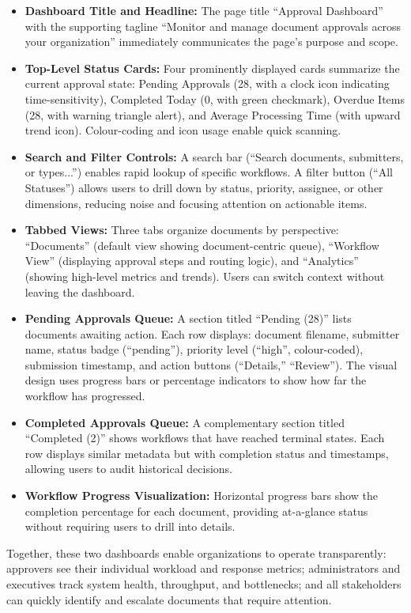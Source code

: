 \documentclass[12pt,oneside,openright,a4paper]{cpe-english-project}
\begin{document}
\begin{itemize}
\item \textbf{Dashboard Title and Headline:} The page title ``Approval Dashboard'' with the supporting tagline ``Monitor and manage document approvals across your organization'' immediately communicates the page's purpose and scope.
\item \textbf{Top-Level Status Cards:} Four prominently displayed cards summarize the current approval state: Pending Approvals (28, with a clock icon indicating time-sensitivity), Completed Today (0, with green checkmark), Overdue Items (28, with warning triangle alert), and Average Processing Time (with upward trend icon). Colour-coding and icon usage enable quick scanning.
\item \textbf{Search and Filter Controls:} A search bar (``Search documents, submitters, or types...'') enables rapid lookup of specific workflows. A filter button (``All Statuses'') allows users to drill down by status, priority, assignee, or other dimensions, reducing noise and focusing attention on actionable items.
\item \textbf{Tabbed Views:} Three tabs organize documents by perspective: ``Documents'' (default view showing document-centric queue), ``Workflow View'' (displaying approval steps and routing logic), and ``Analytics'' (showing high-level metrics and trends). Users can switch context without leaving the dashboard.
\item \textbf{Pending Approvals Queue:} A section titled ``Pending (28)'' lists documents awaiting action. Each row displays: document filename, submitter name, status badge (``pending''), priority level (``high'', colour-coded), submission timestamp, and action buttons (``Details,'' ``Review''). The visual design uses progress bars or percentage indicators to show how far the workflow has progressed.
\item \textbf{Completed Approvals Queue:} A complementary section titled ``Completed (2)'' shows workflows that have reached terminal states. Each row displays similar metadata but with completion status and timestamps, allowing users to audit historical decisions.
\item \textbf{Workflow Progress Visualization:} Horizontal progress bars show the completion percentage for each document, providing at-a-glance status without requiring users to drill into details.
\end{itemize}

Together, these two dashboards enable organizations to operate transparently: approvers see their individual workload and response metrics; administrators and executives track system health, throughput, and bottlenecks; and all stakeholders can quickly identify and escalate documents that require attention.
\end{document}
